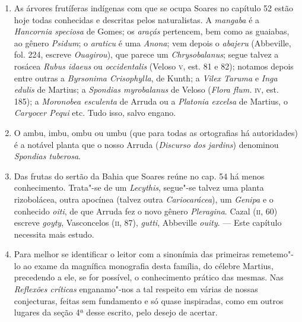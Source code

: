 \begin{enumerate}
\item As árvores frutíferas indígenas com que se ocupa Soares no capítulo 52 estão hoje 
todas conhecidas e descritas pelos naturalistas. A \textit{mangaba} é a \textit{Hancornia speciosa} de 
Gomes; os \textit{araçás} pertencem, bem como as guaiabas, ao gênero \textit{Psidum}; o \textit{araticu} é uma  
\textit{Anona}; vem depois o \textit{abajeru} (Abbeville, fol. 224, escreve \textit{Ouagirou}), que parece um \textit{Chrysobalanus}; 
segue talvez a rosácea \textit{Rubus idaeus} ou \textit{occidentalis} (Veloso \textsc{v}, est. 81 
e 82); notamos depois entre outras a \textit{Byrsonima Crisophylla}, de Kunth; a \textit{Vilex Taruma} e  
\textit{Inga edulis} de Martius; a \textit{Spondias myrobalanus} de Veloso (\textit{Flora flum.} \textsc{iv}, est. 185); a  
\textit{Moronobea esculenta} de Arruda ou a \textit{Platonia excelsa} de Martius, o \textit{Caryocer Pequi} 
etc. Tudo isso, salvo engano.

\item O ambu, imbu, ombu ou umbu (que para todas as ortografias há autoridades) é a 
notável planta que o nosso Arruda (\textit{Discurso dos jardins}) denominou \textit{Spondias tuberosa}.

\item Das frutas do sertão da Bahia que Soares reúne no cap. 54 há menos 
conhecimento. Trata"-se de um \textit{Lecythis}, segue"-se talvez uma planta rizobolácea, outra 
apocínea (talvez outra \textit{Cariocarácea}), um \textit{Genipa} e o conhecido \textit{oiti}, de que Arruda fez o 
novo gênero \textit{Pleragina}. Cazal (\textsc{ii}, 60) escreve \textit{goyty}, Vasconcelos (\textsc{ii}, 87), \textit{gutti}, 
Abbeville \textit{ouity}. --- Este capítulo necessita mais estudo.

\item Para melhor se identificar o leitor com a sinonímia das primeiras remetemo"-lo ao 
exame da magnífica monografia desta família, do célebre Martius, precedendo a ele, se 
for possível, o conhecimento prático das mesmas.
Nas \textit{Reflexões críticas} enganamo"-nos a tal respeito em várias de nossas conjecturas, 
feitas sem fundamento e só quase inspiradas, como em outros lugares da seção 4ª desse 
escrito, pelo desejo de acertar.


\end{enumerate}
